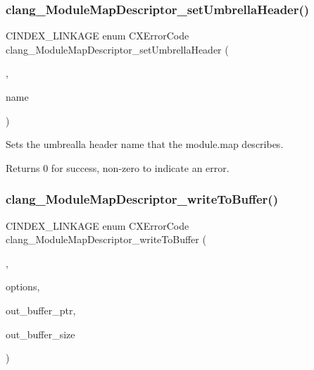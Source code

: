\subsubsection{\texorpdfstring{clang\+\_\+\+Module\+Map\+Descriptor\+\_\+set\+Umbrella\+Header()}{clang\_ModuleMapDescriptor\_setUmbrellaHeader()}}
{\footnotesize\ttfamily C\+I\+N\+D\+E\+X\+\_\+\+L\+I\+N\+K\+A\+GE enum C\+X\+Error\+Code clang\+\_\+\+Module\+Map\+Descriptor\+\_\+set\+Umbrella\+Header (\begin{DoxyParamCaption}\item[{\hyperlink{group__BUILD__SYSTEM_ga8d7eea7855a8d1118218c7661469b3db}{C\+X\+Module\+Map\+Descriptor}}]{,  }\item[{const char $\ast$}]{name }\end{DoxyParamCaption})}



Sets the umbrealla header name that the module.\+map describes. 

\begin{DoxyReturn}{Returns}
0 for success, non-\/zero to indicate an error. 
\end{DoxyReturn}
\mbox{\label{group__BUILD__SYSTEM_gacaeaf475a29b16a041641b6ebe9a012d}} 
\subsubsection{\texorpdfstring{clang\+\_\+\+Module\+Map\+Descriptor\+\_\+write\+To\+Buffer()}{clang\_ModuleMapDescriptor\_writeToBuffer()}}
{\footnotesize\ttfamily C\+I\+N\+D\+E\+X\+\_\+\+L\+I\+N\+K\+A\+GE enum C\+X\+Error\+Code clang\+\_\+\+Module\+Map\+Descriptor\+\_\+write\+To\+Buffer (\begin{DoxyParamCaption}\item[{\hyperlink{group__BUILD__SYSTEM_ga8d7eea7855a8d1118218c7661469b3db}{C\+X\+Module\+Map\+Descriptor}}]{,  }\item[{unsigned}]{options,  }\item[{char $\ast$$\ast$}]{out\+\_\+buffer\+\_\+ptr,  }\item[{unsigned $\ast$}]{out\+\_\+buffer\+\_\+size }\end{DoxyParamCaption})}



